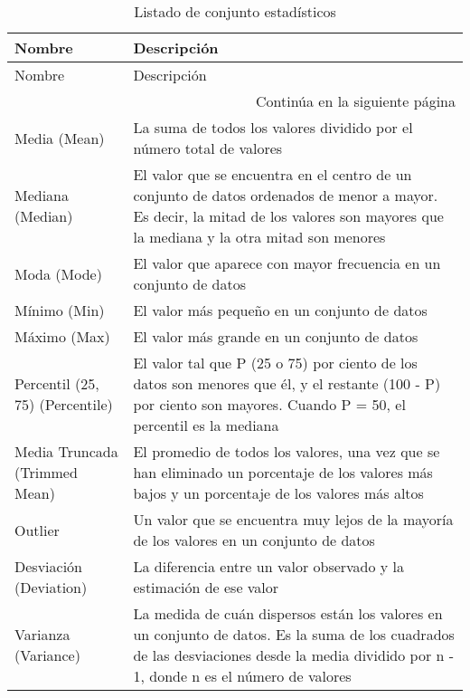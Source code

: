 \begin{longtable}{|m{7em}|m{30em}|}
    \caption{Listado de conjunto estadísticos} 
    \label{tab-stats} \\
    \hline
    \rowcolor[gray]{0.8}
    Nombre & Descripción \\
    \hline
    \endfirsthead
    
    \hline
    \rowcolor[gray]{0.8}
    Nombre & Descripción \\
    \hline
    \endhead
    
    \hline \multicolumn{2}{|r|}{{Continúa en la siguiente página}} \\ \hline
    \endfoot
    
    \hline \hline
    \endlastfoot
    
    \hline
    Media (Mean) & La suma de todos los valores dividido por el número total de valores \\
    \hline
    Mediana (Median) & El valor que se encuentra en el centro de un conjunto de datos ordenados de menor a mayor. Es decir, la mitad de los valores son mayores que la mediana y la otra mitad son menores \\
    \hline
    Moda (Mode) & El valor que aparece con mayor frecuencia en un conjunto de datos \\
    \hline
    Mínimo (Min) & El valor más pequeño en un conjunto de datos \\
    \hline
    Máximo (Max) & El valor más grande en un conjunto de datos \\
    \hline
    Percentil (25, 75) (Percentile) & El valor tal que P (25 o 75) por ciento de los datos son menores que él, y el restante (100 - P) por ciento son mayores. Cuando P = 50, el percentil es la mediana \\
    \hline
    Media Truncada (Trimmed Mean) & El promedio de todos los valores, una vez que se han eliminado un porcentaje de los valores más bajos y un porcentaje de los valores más altos \\
    \hline
    Outlier & Un valor que se encuentra muy lejos de la mayoría de los valores en un conjunto de datos \\
    \hline
    Desviación (Deviation) & La diferencia entre un valor observado y la estimación de ese valor \\
    \hline
    Varianza (Variance) & La medida de cuán dispersos están los valores en un conjunto de datos. Es la suma de los cuadrados de las desviaciones desde la media dividido por n - 1, donde n es el número de valores \\

\end{longtable}
